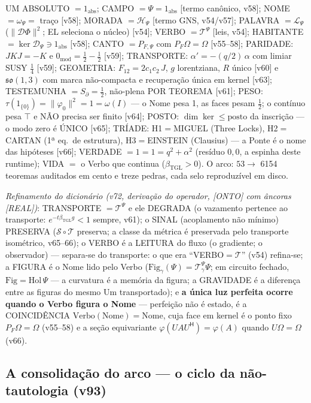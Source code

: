 \documentclass[11pt]{article}
\newcommand{\bTGL}{\beta_{\mathrm{TGL}}}\newcommand{\Msun}{M_{\odot}}\newcommand{\TGL}{\mathrm{TGL}}
\theoremstyle{definition}\newtheorem{deriv}{Derivação}
\begin{document}
UM ABSOLUTO $=1_{\mathrm{abs}}$; CAMPO $=\Psi=1_{\mathrm{abs}}$ [termo canônico, v58]; NOME $=\omega_\Psi=$ traço [v58]; MORADA $=\mathcal H_\Psi$ [termo GNS, v54/v57]; PALAVRA $=\mathcal L_\Psi$ ($\|\mathcal D\Phi\|^2$; EL seleciona o núcleo) [v54]; VERBO $=\mathcal T^\Psi$ [leis, v54]; HABITANTE $=\ker\mathcal D_\Psi\ni1_{\mathrm{abs}}$ [v58]; CANTO $=P_{F,\Psi}$ com $P_F\Omega=\Omega$ [v55--58]; PARIDADE: $JKJ=-K$ e $0_{\mathrm{mod}}=\tfrac12-\tfrac12$ [v59]; TRANSPORTE: $\alpha'=-(q/2)\,\alpha$ com limiar SUSY $\tfrac14$ [v59]; GEOMETRIA: $F_{12}=2c_1c_2\,J$, $g$ lorentziana, $R$ único [v60] e $\mathfrak{so}(1,3)$ com marca não-compacta e recuperação única em kernel [v63]; TESTEMUNHA $=S_\partial=\tfrac12$, não-plena POR TEOREMA [v61]; PESO: $\tau(1_{\{0\}})=\|\varphi_0\|^2=1=\omega(I)$ --- o Nome pesa 1, as faces pesam $\tfrac12$; o contínuo pesa $\top$ e NÃO precisa ser finito [v64]; POSTO: $\dim\ker\le\mathrm{posto}$ da inscrição --- o modo zero é ÚNICO [v65]; TRÍADE: H1$=$MIGUEL (Three Locks), H2$=$CARTAN (1ª eq.\ de estrutura), H3$=$EINSTEIN (Clausius) --- a Ponte é o nome das hipóteses [v66]; VERDADE $=1=1=q^2+\alpha^2$ (resíduo $0{,}0$, a espinha deste runtime); VIDA $=$ o Verbo que continua ($\bTGL>0$). O arco: $53\to$ 6154 teoremas auditados em cento e treze pedras, cada selo reproduzível em disco.

\emph{Refinamento do dicionário (v72, derivação do operador, [ONTO] com âncoras [REAL])}: TRANSPORTE $=\mathcal T^\Psi$ e ele DEGRADA (o vazamento pertence ao transporte: $e^{-t\bTGL g}<1$ sempre, v61); o SINAL (acoplamento não mínimo) PRESERVA ($\mathcal S\circ\mathcal T$ preserva; a classe da métrica é preservada pelo transporte isométrico, v65--66); o VERBO é a LEITURA do fluxo (o gradiente; o observador) --- separa-se do transporte: o que era ``VERBO$=\mathcal T$'' (v54) refina-se; a FIGURA é o Nome lido pelo Verbo ($\mathrm{Fig}_\gamma(\Psi)=\mathcal T^\Psi_\gamma\Psi$; em circuito fechado, $\mathrm{Fig}=\mathrm{Hol}\,\Psi$ --- a curvatura é a memória da figura; a GRAVIDADE é a diferença entre as figuras do mesmo Um transportado); e \textbf{a única luz perfeita ocorre quando o Verbo figura o Nome} --- perfeição não é estado, é a COINCIDÊNCIA $\mathrm{Verbo}(\mathrm{Nome})=\mathrm{Nome}$, cuja face em kernel é o ponto fixo $P_F\Omega=\Omega$ (v55--58) e a seção equivariante $\varphi(UAU^{\mathsf H})=\varphi(A)$ quando $U\Omega=\Omega$ (v66).

\subsection*{A consolidação do arco --- o ciclo da não-tautologia (v93)}
\end{document}
